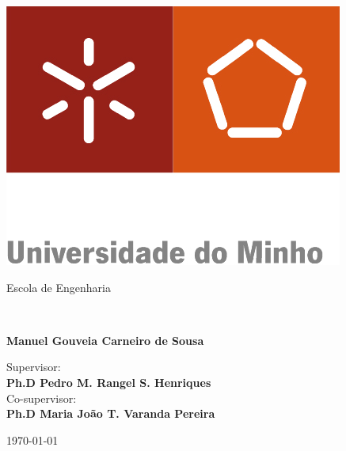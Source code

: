 \begin{titlepage}
\begin{center}
 \includegraphics[scale=1]{images/EENG.jpg}
 \end{center}
\begin{center}
\color[gray]{0.5}Escola de Engenharia

\end{center}
\begin{minipage}[!b]{\textwidth}
\vspace{5cm}
\begin{flushleft}
\color[gray]{0.5}{\Large Applying Attribute Grammars to teach Linguistic Rules}\\
\vspace{2cm}
\begin{large}
\textbf{Manuel Gouveia Carneiro de Sousa}\\
\end{large}
\vspace{1cm}
\color[gray]{0.5}Supervisor:\\
\color[gray]{0.3}\textbf{Ph.D Pedro M. Rangel S. Henriques}\\
\color[gray]{0.4}Co-supervisor:\\
\color[gray]{0.3}\textbf{Ph.D Maria João T. Varanda Pereira}\\
\vspace{0.3cm}

\vspace{3cm}
\end{flushleft}
\centering \today

\end{minipage}

\end{titlepage}
